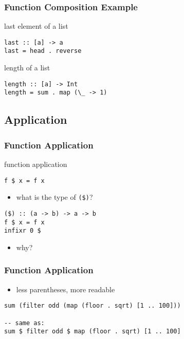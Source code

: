 \documentclass[dvipsnames]{beamer}
\theoremstyle{plain}
\begin{document}
\begin{frame}[fragile]
  \frametitle{Function Composition Example}

  \begin{exampleblock}{last element of a list}
    \begin{lstlisting}
last :: [a] -> a
last = head . reverse
    \end{lstlisting}
  \end{exampleblock}

  \pause
  \begin{exampleblock}{length of a list}
    \begin{lstlisting}
length :: [a] -> Int
length = sum . map (\_ -> 1)
    \end{lstlisting}
  \end{exampleblock}
\end{frame}

\subsection{Application}

\begin{frame}[fragile]
  \frametitle{Function Application}

  \begin{block}{function application}
    \begin{lstlisting}
f $ x = f x
    \end{lstlisting}
  \end{block}

  \pause
  \begin{itemize}
    \item what is the type of \lstinline|($)|?
  \end{itemize}

  \begin{exampleblock}{}
    \begin{lstlisting}
($) :: (a -> b) -> a -> b
f $ x = f x
infixr 0 $
    \end{lstlisting}
  \end{exampleblock}

  \pause
  \begin{itemize}
    \item why?
  \end{itemize}
\end{frame}

\begin{frame}[fragile]
  \frametitle{Function Application}

  \begin{itemize}
    \item less parentheses, more readable
  \end{itemize}

  \begin{exampleblock}{}
    \begin{lstlisting}
sum (filter odd (map (floor . sqrt) [1 .. 100]))

-- same as:
sum $ filter odd $ map (floor . sqrt) [1 .. 100]
    \end{lstlisting}
  \end{exampleblock}
\end{frame}
\end{document}
